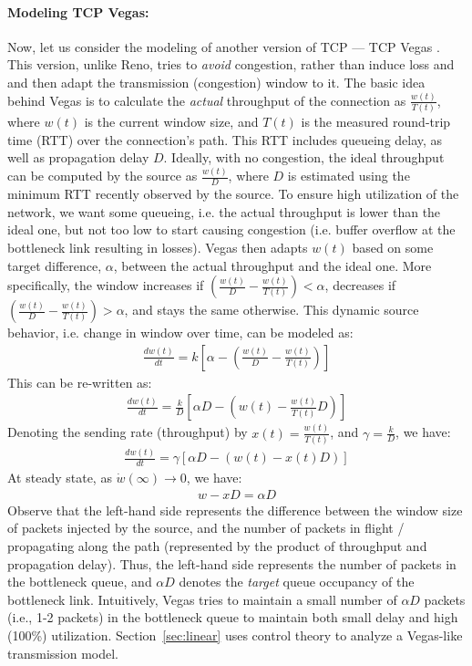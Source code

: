 \documentclass{article}
\begin{document}
\paragraph{Modeling TCP Vegas:} 
Now, let us consider the modeling of another version of TCP --- TCP Vegas \cite{vegas:1995}.
This version, unlike Reno, tries to {\em avoid} congestion, rather than induce loss and 
and then adapt the transmission (congestion) window to it.  
The basic idea behind Vegas is to calculate the {\em actual} throughput of the connection
as $\frac{w(t)}{T(t)}$, where $w(t)$ is the current window size,
and $T(t)$ is the measured round-trip time (RTT) over the connection's path.
This RTT includes queueing delay, as well as propagation delay $D$.
Ideally, with no congestion, the ideal throughput can be computed by the source
as $\frac{w(t)}{D}$, where $D$ is estimated using the minimum RTT recently observed by the source.
To ensure high utilization of the network, we want some queueing, i.e. 
the actual throughput is lower than the ideal one, but not too low to start causing congestion (i.e. buffer overflow
at the bottleneck link resulting in losses).
Vegas then adapts $w(t)$ based on some target difference, $\alpha$, 
between the actual throughput and the ideal one.
More specifically,
the window increases if $(\frac{w(t)}{D} - \frac{w(t)}{T(t)}) < \alpha$,
decreases if $(\frac{w(t)}{D} - \frac{w(t)}{T(t)}) > \alpha$,
and stays the same otherwise. This dynamic source behavior,
i.e. change in window over time, can be modeled as:
\begin{eqnarray*}
\frac{dw(t)}{dt} = k [\alpha - (\frac{w(t)}{D} - \frac{w(t)}{T(t)})]
\end{eqnarray*}
This can be re-written as:
\begin{eqnarray*}
\frac{dw(t)}{dt} = \frac{k}{D} [\alpha D - (w(t) - \frac{w(t)}{T(t)}D)]
\end{eqnarray*}
Denoting the sending rate (throughput) by $x(t) = \frac{w(t)}{T(t)}$, 
and $\gamma = \frac{k}{D}$, we have:
\begin{eqnarray*}
\frac{dw(t)}{dt} = \gamma [\alpha D - (w(t) - x(t)D)]
\end{eqnarray*}
At steady state, as $\dot{w}(\infty) \rightarrow 0$, we have:
\begin{eqnarray*}
w - x D = \alpha D
\end{eqnarray*}
Observe that the left-hand side represents the difference between the window size of packets
injected by the source, and the number of packets in flight / propagating along the path (represented by
the product of throughput and propagation delay). Thus,
the left-hand side represents the number of packets in the bottleneck queue,
and $\alpha D$ denotes the {\em target} queue occupancy of the bottleneck link.
Intuitively, Vegas tries to maintain a small number of $\alpha D$ packets
(i.e., 1-2 packets)
in the bottleneck queue to maintain both small delay and high (100\%) utilization.
Section~\ref{sec:linear} uses control theory to analyze a Vegas-like transmission model.
\end{document}
